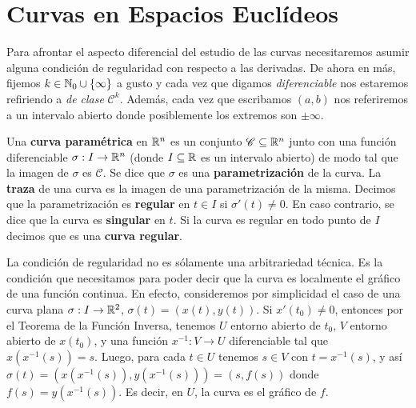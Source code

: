 \section{Curvas en Espacios Euclídeos}

Para afrontar el aspecto diferencial del estudio de las curvas necesitaremos asumir alguna condición de regularidad con respecto a las derivadas. De ahora en más, fijemos $k\in \mathbb{N}_0\cup\{\infty\}$ a gusto y cada vez que digamos \textit{diferenciable} nos estaremos refiriendo a \textit{de clase} $\mathscr{C}^k$. Además, cada vez que escribamos $(a,b)$ nos referiremos a un intervalo abierto donde posiblemente los extremos son $\pm\infty$.

\begin{defn}
Una \textbf{curva paramétrica} en $\mathbb{R}^n$ es un conjunto $\mathscr{C}\subseteq\mathbb{R}^n$ junto con una función diferenciable $\sigma:I\to\mathbb{R}^n$ (donde $I\subseteq\mathbb{R}$ es un intervalo abierto) de modo tal que la imagen de $\sigma$ es $\mathscr{C}$. Se dice que $\sigma$ es una \textbf{parametrización} de la curva. La \textbf{traza} de una curva es la imagen de una parametrización de la misma. Decimos que la parametrización es \textbf{regular} en $t\in I$ si $\sigma'(t)\neq 0$. En caso contrario, se dice que la curva es \textbf{singular} en $t$. Si la curva es regular en todo punto de $I$ decimos que es una \textbf{curva regular}.
\end{defn}

\begin{obs}
La condición de regularidad no es sólamente una arbitrariedad técnica. Es la condición que necesitamos para poder decir que la curva es localmente el gráfico de una función continua. En efecto, consideremos por simplicidad el caso de una curva plana $\sigma:I\to\mathbb{R}^2$, $\sigma(t)=(x(t),y(t))$. Si $x'(t_0)\neq 0$, entonces por el Teorema de la Función Inversa, tenemos $U$ entorno abierto de $t_0$, $V$ entorno abierto de $x(t_0)$, y una función $x^{-1}:V\to U$ diferenciable tal que $x(x^{-1}(s))=s$. Luego, para cada $t\in U$ tenemos $s\in V$ con $t=x^{-1}(s)$, y así $\sigma(t)=(x(x^{-1}(s)),y(x^{-1}(s))) = (s,f(s))$ donde $f(s)=y(x^{-1}(s))$. Es decir, en $U$, la curva es el gráfico de $f$.
\end{obs}

